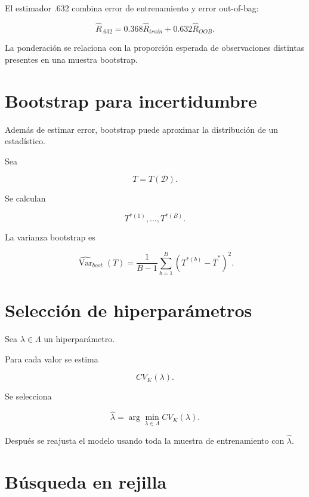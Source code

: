 \documentclass[
  spanish,
  10.5pt,
  letterpaper,
  DIV=11,
  numbers=noendperiod,
  oneside,
  open=any]{scrreprt}
\theoremstyle{definition}
\theoremstyle{definition}
\theoremstyle{plain}
\theoremstyle{remark}
\begin{document}

El estimador .632 combina error de entrenamiento y error out-of-bag:

\[
\widehat{R}_{.632}
=
0.368
\widehat{R}_{train}
+
0.632
\widehat{R}_{OOB}.
\]

La ponderación se relaciona con la proporción esperada de observaciones
distintas presentes en una muestra bootstrap.

\section*{Bootstrap para
incertidumbre}\label{bootstrap-para-incertidumbre}


Además de estimar error, bootstrap puede aproximar la distribución de un
estadístico.

Sea

\[
T=T(\mathcal{D}).
\]

Se calculan

\[
T^{*(1)},\ldots,T^{*(B)}.
\]

La varianza bootstrap es

\[
\widehat{\operatorname{Var}}_{boot}(T)
=
\frac{1}{B-1}
\sum_{b=1}^{B}
\left(
T^{*(b)}
-
\overline{T}^{*}
\right)^2.
\]

\section*{Selección de
hiperparámetros}\label{selecciuxf3n-de-hiperparuxe1metros}


Sea \(\lambda\in\Lambda\) un hiperparámetro.

Para cada valor se estima

\[
CV_K(\lambda).
\]

Se selecciona

\[
\widehat{\lambda}
=
\arg\min_{\lambda\in\Lambda}
CV_K(\lambda).
\]

Después se reajusta el modelo usando toda la muestra de entrenamiento
con \(\widehat{\lambda}\).

\section*{Búsqueda en rejilla}\label{buxfasqueda-en-rejilla}
\end{document}
